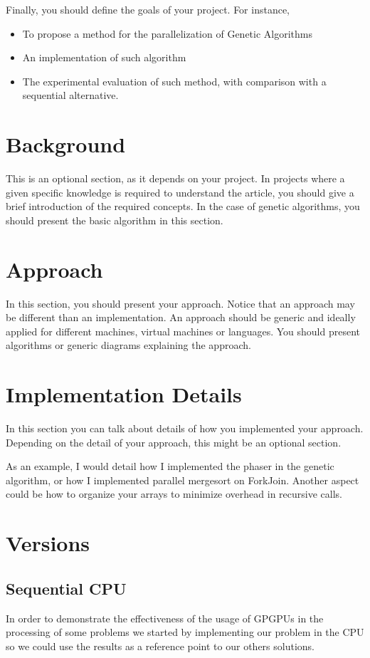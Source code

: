 \documentclass[runningheads]{llncs}
\begin{document}
Finally, you should define the goals of your project. For instance,

\begin{itemize}
	\item To propose a method for the parallelization of Genetic Algorithms
	\item An implementation of such algorithm
	\item The experimental evaluation of such method, with comparison with a sequential alternative.
\end{itemize}


\section{Background}

This is an optional section, as it depends on your project. In projects where a given specific knowledge is required to understand the article, you should give a brief introduction of the required concepts. In the case of genetic algorithms, you should present the basic algorithm in this section.


\section{Approach}

In this section, you should present your approach. Notice that an approach may be different than an implementation. An approach should be generic and ideally applied for different machines, virtual machines or languages. You should present algorithms or generic diagrams explaining the approach.

\section{Implementation Details}

In this section you can talk about details of how you implemented your approach. Depending on the detail of your approach, this might be an optional section.

As an example, I would detail how I implemented the phaser in the genetic algorithm, or how I implemented parallel mergesort on ForkJoin. Another aspect could be how to organize your arrays to minimize overhead in recursive calls.

\section{Versions}
\subsection{Sequential CPU}
In order to demonstrate the effectiveness of the usage of GPGPUs in the processing 
of some problems we started by implementing our problem in the CPU so we could use the results as a reference point to our others solutions.
\end{document}
